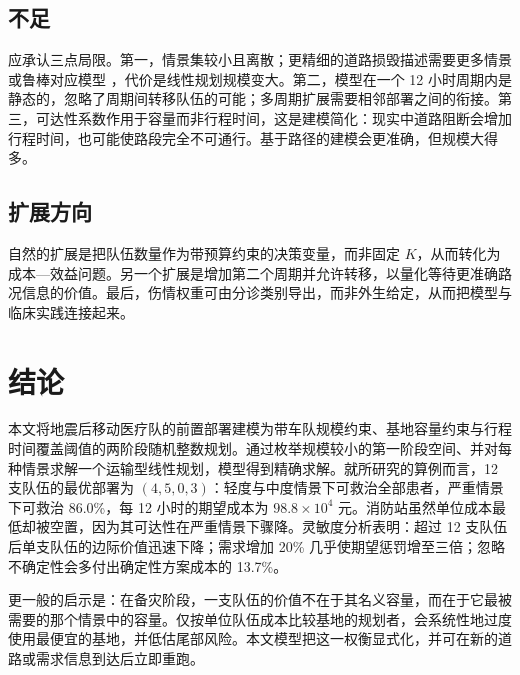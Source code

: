 \documentclass[12pt,a4paper,fontset=windows]{ctexart}
\begin{document}
\subsection{不足}

应承认三点局限。第一，情景集较小且离散；更精细的道路损毁描述需要更多情景或鲁棒对应模型 \cite{bental2009}，代价是线性规划规模变大。第二，模型在一个 12 小时周期内是静态的，忽略了周期间转移队伍的可能；多周期扩展需要相邻部署之间的衔接。第三，可达性系数作用于容量而非行程时间，这是建模简化：现实中道路阻断会增加行程时间，也可能使路段完全不可通行。基于路径的建模会更准确，但规模大得多。

\subsection{扩展方向}

自然的扩展是把队伍数量作为带预算约束的决策变量，而非固定 $K$，从而转化为成本—效益问题。另一个扩展是增加第二个周期并允许转移，以量化等待更准确路况信息的价值。最后，伤情权重可由分诊类别导出，而非外生给定，从而把模型与临床实践连接起来。

\section{结论}

本文将地震后移动医疗队的前置部署建模为带车队规模约束、基地容量约束与行程时间覆盖阈值的两阶段随机整数规划。通过枚举规模较小的第一阶段空间、并对每种情景求解一个运输型线性规划，模型得到精确求解。就所研究的算例而言，12 支队伍的最优部署为 $(4,5,0,3)$：轻度与中度情景下可救治全部患者，严重情景下可救治 86.0\%，每 12 小时的期望成本为 $98.8\times10^{4}$ 元。消防站虽然单位成本最低却被空置，因为其可达性在严重情景下骤降。灵敏度分析表明：超过 12 支队伍后单支队伍的边际价值迅速下降；需求增加 20\% 几乎使期望惩罚增至三倍；忽略不确定性会多付出确定性方案成本的 13.7\%。

更一般的启示是：在备灾阶段，一支队伍的价值不在于其名义容量，而在于它最被需要的那个情景中的容量。仅按单位队伍成本比较基地的规划者，会系统性地过度使用最便宜的基地，并低估尾部风险。本文模型把这一权衡显式化，并可在新的道路或需求信息到达后立即重跑。
\end{document}
